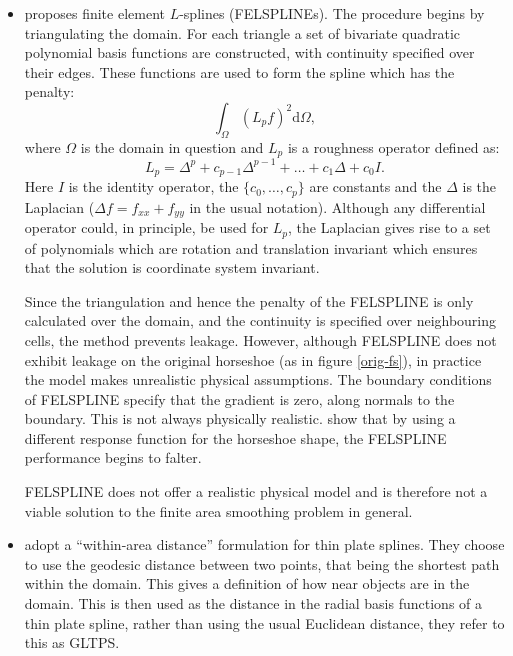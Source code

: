 \documentclass[10pt]{article}
\begin{document}
\begin{itemize}
\item \cite{ramsay} proposes finite element $L$-splines (FELSPLINEs). The procedure begins by triangulating the domain. For each triangle a set of bivariate quadratic polynomial basis functions are constructed, with continuity specified over their edges. These functions are used to form the spline which has the  penalty:
\begin{equation}
\int_\Omega (L_p f)^2 \text{d}\Omega,
\end{equation}
where $\Omega$ is the domain in question and $L_p$ is a roughness operator defined as:
\begin{equation}
L_p=\Delta^p+c_{p-1}\Delta^{p-1}+\dots+c_1\Delta+c_0I.
\end{equation}
Here $I$ is the identity operator, the $\{c_0,\dots, c_p\}$ are constants and the $\Delta$ is the Laplacian ($\Delta f = f_{xx}+f_{yy}$ in the usual notation). Although any differential operator could, in principle, be used for $L_p$, the Laplacian gives rise to a set of polynomials which are rotation and translation invariant which ensures that the solution is coordinate system invariant.

Since the triangulation and hence the penalty of the FELSPLINE is only calculated over the domain, and the continuity is specified over neighbouring cells, the method prevents leakage. However, although FELSPLINE does not exhibit leakage on the original horseshoe (as in figure \ref{orig-fs}), in practice the model makes unrealistic physical assumptions. The boundary conditions of FELSPLINE specify that the gradient is zero, along normals to the boundary. This is not always physically realistic. \cite{soap} show that by using a different response function for the horseshoe shape, the FELSPLINE performance begins to falter.

FELSPLINE does not offer a realistic physical model and is therefore not a viable solution to the finite area smoothing problem in general.

\item \cite{wangranalli} adopt a ``within-area distance'' formulation for thin plate splines. They choose to use the geodesic distance between two points, that being the shortest path within the domain. This gives a definition of how near objects are in the domain. This is then used as the distance in the radial basis functions of a thin plate spline, rather than using the usual Euclidean distance, they refer to this as GLTPS.


\end{itemize}
\end{document}
